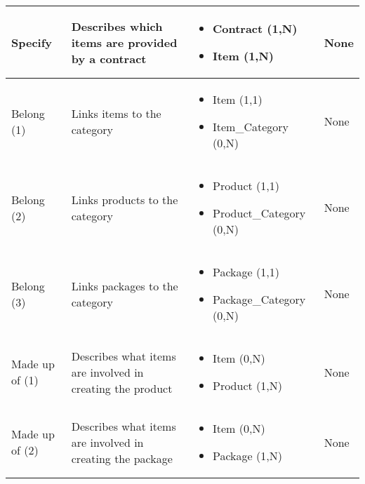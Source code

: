 \begin{longtable}{|p{}|p{} |p{}|p{} |}
Specify & Describes which items are provided by a contract  & \begin{itemize}
	\vspace{-1em}
	\item Contract (1,N)
	\item Item (1,N)
	\end{itemize}
&  None\\\hline

Belong (1) & Links items to the category  & \begin{itemize}
	\vspace{-1em}
	\item Item (1,1)
	\item Item\_Category (0,N)
\end{itemize}
&  None \\\hline


Belong (2) & Links products to the category & \begin{itemize}
	\vspace{-1em}
	\item Product (1,1)
	\item Product\_Category (0,N)
\end{itemize}
&  None \\\hline

Belong (3) & Links packages to the category  & \begin{itemize}
	\vspace{-1em}
	\item Package (1,1)
	\item Package\_Category (0,N)
\end{itemize}
&  None \\\hline

Made up of (1) & Describes what items are involved in creating the product & \begin{itemize}
	\vspace{-1em}
	\item Item (0,N)
	\item Product (1,N)
\end{itemize}
&  None \\\hline

Made up of (2) & Describes what items are involved in creating the package & \begin{itemize}
	\vspace{-1em}
	\item Item (0,N)
	\item Package (1,N)
\end{itemize}
&  None \\\hline



\end{longtable}
